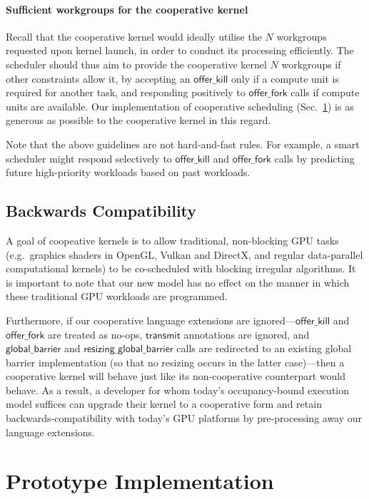 \documentclass[numbers,nocopyrightspace,10pt]{sigplanconf}
\newcommand{\mysec}{Sec.~}
\newcommand{\transmit}{\mathsf{transmit}}
\newcommand{\offerfork}{\mathsf{offer\_fork}}
\newcommand{\offerkill}{\mathsf{offer\_kill}}
\newcommand{\globalbarrier}{\mathsf{global\_barrier}}
\newcommand{\resizingglobalbarrier}{\mathsf{resizing\_global\_barrier}}
\begin{document}
\paragraph{Sufficient workgroups for the cooperative kernel}

Recall that the cooperative kernel would ideally utilise the $N$
workgroups requested upon kernel launch, in order to conduct its
processing efficiently.  The scheduler should thus aim to provide the
cooperative kernel $N$ workgroups if other constraints allow it,
by accepting an $\offerkill$ only if a compute unit is required for another
task, and responding positively to $\offerfork$ calls if compute units are available.  Our
implementation of cooperative scheduling (\mysec\ref{sec:implementation}) is as
generous as possible to the cooperative kernel in this regard.

Note that the above guidelines are not hard-and-fast rules.  For
example, a smart scheduler might respond selectively to $\offerkill$
and $\offerfork$ calls by predicting future high-priority workloads
based on past workloads.


\subsection{Backwards Compatibility}\label{sec:backwardscompatibility}

A goal of coopeative kernels is to allow traditional, non-blocking GPU
tasks (e.g.\ graphics shaders in OpenGL, Vulkan and DirectX, and regular data-parallel computational kernels)
to be co-scheduled with blocking irregular algorithms.  It is
important to note that our new model has no effect on the manner in
which these traditional GPU workloads are programmed.

Furthermore, if our cooperative language extensions are
ignored---$\offerkill$ and $\offerfork$ are treated as no-ops,
$\transmit$ annotations are ignored, and $\globalbarrier$ and
$\resizingglobalbarrier$ calls are redirected to an existing global
barrier implementation (so that no resizing occurs in the latter
case)---then a cooperative kernel will behave just like its
non-cooperative counterpart would behave.  As a result, a developer
for whom today's occupancy-bound execution model suffices can upgrade
their kernel to a cooperative form and retain backwards-compatibility
with today's GPU platforms by pre-processing away our language
extensions.


\section{Prototype Implementation}\label{sec:implementation}
\end{document}

